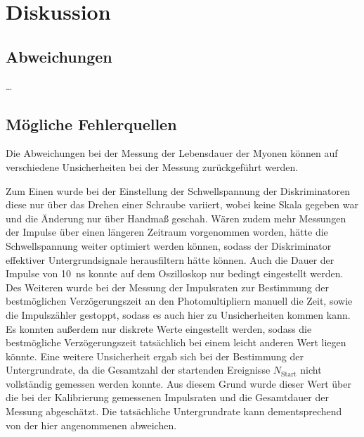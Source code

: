 \section{Diskussion}
\label{sec:diskussion}

\subsection{Abweichungen}

…


\subsection{Mögliche Fehlerquellen}

Die Abweichungen bei der Messung der Lebensdauer der Myonen können auf verschiedene Unsicherheiten bei der Messung zurückgeführt werden.

Zum Einen wurde bei der Einstellung der Schwellspannung der Diskriminatoren diese nur über das Drehen einer Schraube variiert,
wobei keine Skala gegeben war und die Änderung nur über Handmaß geschah.
Wären zudem mehr Messungen der Impulse über einen längeren Zeitraum vorgenommen worden,
hätte die Schwellspannung weiter optimiert werden können,
sodass der Diskriminator effektiver Untergrundsignale herausfiltern hätte können.
Auch die Dauer der Impulse von \SI{10}{\nano\second} konnte auf dem Oszilloskop nur bedingt eingestellt werden.
Des Weiteren wurde bei der Messung der Impulsraten zur Bestimmung der bestmöglichen Verzögerungszeit an den Photomultipliern manuell die Zeit,
sowie die Impulszähler gestoppt,
sodass es auch hier zu Unsicherheiten kommen kann.
Es konnten außerdem nur diskrete Werte eingestellt werden,
sodass die bestmögliche Verzögerungszeit tatsächlich bei einem leicht anderen Wert liegen könnte.
Eine weitere Unsicherheit ergab sich bei der Bestimmung der Untergrundrate,
da die Gesamtzahl der startenden Ereignisse $N_\text{Start}$ nicht vollständig gemessen werden konnte.
Aus diesem Grund wurde dieser Wert über die bei der Kalibrierung gemessenen Impulsraten und die Gesamtdauer der Messung abgeschätzt.
Die tatsächliche Untergrundrate kann dementsprechend von der hier angenommenen abweichen.

